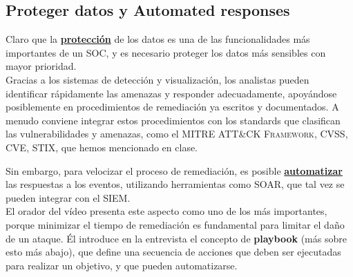 \subsection{Proteger datos y Automated responses}

Claro que la \ul{\textbf{protección}} de los datos es una de las funcionalidades más importantes de un SOC, y es necesario proteger los datos más sensibles con mayor prioridad.\\
Gracias a los sistemas de detección y visualización, los analistas pueden identificar rápidamente las amenazas y responder adecuadamente, apoyándose posiblemente en procedimientos de remediación ya escritos y documentados. 
A menudo conviene integrar estos procedimientos con los standards que clasifican las vulnerabilidades y amenazas, como el \textsc{MITRE ATT\&CK Framework}, \textsc{CVSS}, \textsc{CVE}, \textsc{STIX}, que hemos mencionado en clase. 

Sin embargo, para velocizar el proceso de remediación, es posible \ul{\textbf{automatizar}} las respuestas a los eventos, utilizando herramientas como \textsc{SOAR}, que tal vez se pueden integrar con el \textsc{SIEM}.\\
El orador del vídeo presenta este aspecto como uno de los más importantes, porque minimizar el tiempo de remediación es fundamental para limitar el daño de un ataque.
Él introduce en la entrevista el concepto de \textbf{playbook} (más sobre esto más abajo), que define una secuencia de acciones que deben ser ejecutadas para realizar un objetivo, y que pueden automatizarse.






